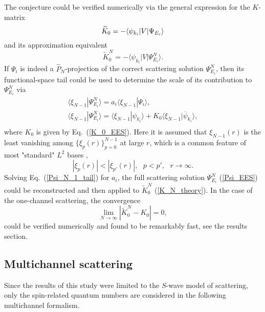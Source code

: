 \documentclass[aip
, pra
, showpacs
, aps
, twocolumn
, groupedaddress
, floatfix
]{revtex4}
\newcommand{\beq}{\begin{equation}}
\newcommand{\eeq}{\end{equation}}
\newcommand{\barr}{\begin{array}}
\newcommand{\earr}{\end{array}}
\begin{document}
The conjecture could be verified numerically via the general expression for the $K$-matrix \cite{N82}
\beq
\widetilde{K}_0 = -\langle \psi_{k_i} | V | \Psi_{E_i} \rangle\\
\label{K_theory}\eeq
and its approximation equivalent
\beq
\widetilde{K}^N_0 = -\langle \psi_{k_i} | V | \Psi^N_{E_i} \rangle.
\label{K_N_theory}\eeq
If $\Psi_i$ is indeed a $\hat{P}_N$-projection of the correct scattering solution $\Psi^N_{E_i}$,
then its functional-space tail could be used to
determine the scale of its contribution to $\Psi^N_{E_i}$ via
\beq \barr{l}
\langle \xi_{N-1} | \Psi^N_{E_i}\rangle
= a_i \langle \xi_{N-1}| \Psi_i \rangle,\\
\langle \xi_{N-1} | \Psi^N_{E_i}\rangle
 =  \langle \xi_{N-1}| \psi_{k_i} \rangle
+ K_0 \langle \xi_{N-1}| \overline{\psi}_{k_i} \rangle,\\
\earr \label{Psi_N_1_tail} \eeq
where $K_0$ is given by Eq.~(\ref{K_0_EES}).
Here it is assumed that $\xi_{N-1}(r)$ is the least vanishing among $\{\xi_p(r)\}_{p=0}^{N-1}$  at large $r$, which is
a common feature of most "standard" $L^2$ bases \cite{abramowitz},
\beq
|\xi_p(r)| < |\xi_{p'}(r)|, \ \ \ p<p', \ \ \ r \rightarrow \infty.
\eeq
Solving Eq.~(\ref{Psi_N_1_tail}) for $a_i$,
the full scattering solution $\Psi^N_{E_i}$ (\ref{Psi_EES}) could be reconstructed and then applied to $\widetilde{K}^N_0$ (\ref{K_N_theory}).
In the case of the one-channel scattering, the convergence
\beq
\lim_{N \rightarrow \infty} |\widetilde{K}^N_0 - K_0 | = 0,
\label{K_N_0_lim} \eeq
could be verified numerically and found to be
remarkably fast, see the results section.



\subsection{Multichannel scattering}
Since the results of this study were limited to the $S$-wave model of scattering,
only the spin-related quantum numbers are considered in the
following multichannel formalism.
\end{document}
